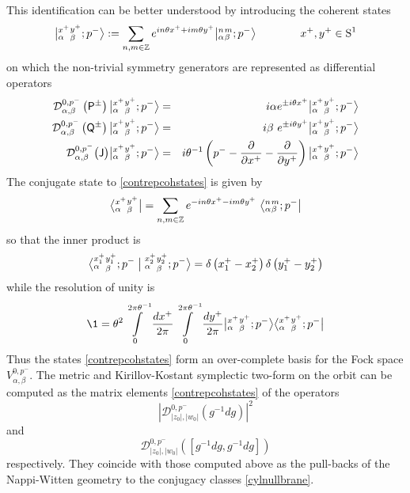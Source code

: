 This identification can be better understood by introducing the coherent states
\begin{equation}
  \label{contrepcohstates}
  \bigl| {}^{x^+}_\alpha {}^{y^+}_\beta ; p^-
  \bigr\rangle:=\sum_{n,m\in{\mathbb Z}}
   e^{ i n \theta x^++ i m \theta y^+}\bigl| {}^n_\alpha {}^m_\beta
  ; p^-\bigr\rangle \qquad\qquad x^+,y^+\in\operatorname{S}^1
\end{equation}
on which the non-trivial symmetry generators are represented as differential
operators
\begin{eqnarray}
  \label{contrepcohactions}
  \mathcal{D}^{0,p^-}_{\alpha,\beta}\left({\sf P}^\pm\right)
  \bigl| {}^{x^+}_\alpha {}^{y^+}_\beta ; p^-\bigr\rangle
  &=& i\alpha e^{\pm i\theta x^+} \bigl| {}^{x^+}_\alpha {}^{y^+}_\beta
  ; p^-\bigr\rangle \\\nonumber
  \mathcal{D}^{0,p^-}_{\alpha,\beta}\left({\sf Q}^\pm\right)
  \bigl| {}^{x^+}_\alpha {}^{y^+}_\beta ; p^-\bigr\rangle
  &=& i\beta~ e^{\pm i\theta y^+} \bigl| {}^{x^+}_\alpha {}^{y^+}_\beta
  ; p^-\bigr\rangle \\ \nonumber
  \mathcal{D}^{0,p^-}_{\alpha,\beta}\bigl({\sf J} \bigr)\bigl| 
  {}^{x^+}_\alpha {}^{y^+}_\beta ; p^-\bigr\rangle
  &=& i\theta^{-1} \left(p^--\frac\partial{\partial x^+}-
      \frac\partial{\partial y^+}\right) \bigl| {}^{x^+}_\alpha 
  {}^{y^+}_\beta ; p^-\bigr\rangle
\end{eqnarray}
The conjugate state to \eqref{contrepcohstates} is given by
\begin{equation}
  \label{contrepconjstate}
  \bigl\langle {}^{x^+}_\alpha {}^{y^+}_\beta\bigr|=\sum_{n,m\in{\mathbb Z}}
  e^{- i n \theta x^+- i
    m \theta y^+}~\bigl\langle {}^n_\alpha {}^m_\beta ; p^-\bigr|
\end{equation}
so that the inner product is
\begin{equation}
  \label{contrepinnerprod}
  \bigl\langle {}^{x_1^+}_\alpha {}^{y_1^+}_\beta ; p^-
  \bigm|{}^{x_2^+}_\alpha {}^{y_2^+}_\beta ; p^-\bigr\rangle=\delta\left(
    x_1^+-x_2^+\right) \delta\left(y_1^+-y_2^+\right)
\end{equation}
while the resolution of unity is
\begin{equation}
  \label{contrepresunity}
  \1 = \theta^2 \int\limits_0^{2\pi \theta^{-1}}\frac{ d x^+}{2\pi}
  \int\limits_0^{2\pi \theta^{-1}}\frac{ d y^+}{2\pi}
  \bigl| {}^{x^+}_\alpha {}^{y^+}_\beta ; p^-\bigr\rangle\bigl
  \langle {}^{x^+}_\alpha {}^{y^+}_\beta ; p^-\bigr|
\end{equation}
Thus the states \eqref{contrepcohstates} form an over-complete basis for the
Fock space $V^{0,p^-}_{\alpha,\beta}$. The metric and Kirillov-Kostant
symplectic two-form on the orbit can be computed as the matrix elements
\eqref{contrepcohstates} of the operators
\begin{equation*}
  |\mathcal{D}_{|z_0|,|w_0|}^{0,p^-}(g^{-1} d g)|^2 
\end{equation*}
and
\begin{equation*}
  \mathcal{D}_{|z_0|,|w_0|}^{0,p^-}([g^{-1} d g , g^{-1} d g])
\end{equation*}
respectively. They coincide with those computed above as the pull-backs of the
Nappi-Witten geometry to the conjugacy classes \eqref{cylnullbrane}.


